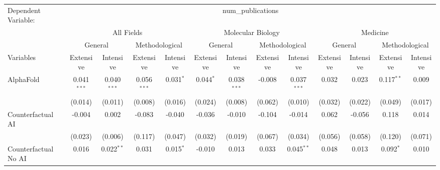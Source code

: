 \begingroup
\centering
\begin{tabular}{lcccccccccccc}
   \tabularnewline \midrule \midrule
   Dependent Variable: & \multicolumn{12}{c}{num\_publications}\\
 & \multicolumn{4}{c}{All Fields} & \multicolumn{4}{c}{Molecular Biology} & \multicolumn{4}{c}{Medicine} \\
\cmidrule(lr){2-5} \cmidrule(lr){6-9} \cmidrule(lr){10-13}
 & \multicolumn{2}{c}{General} & \multicolumn{2}{c}{Methodological} & \multicolumn{2}{c}{General} & \multicolumn{2}{c}{Methodological} & \multicolumn{2}{c}{General} & \multicolumn{2}{c}{Methodological} \\
\cmidrule(lr){2-3} \cmidrule(lr){4-5} \cmidrule(lr){6-7} \cmidrule(lr){8-9} \cmidrule(lr){10-11} \cmidrule(lr){12-13}
Variables & \multicolumn{1}{c}{Extensive} & \multicolumn{1}{c}{Intensive} & \multicolumn{1}{c}{Extensive} & \multicolumn{1}{c}{Intensive} & \multicolumn{1}{c}{Extensive} & \multicolumn{1}{c}{Intensive} & \multicolumn{1}{c}{Extensive} & \multicolumn{1}{c}{Intensive} & \multicolumn{1}{c}{Extensive} & \multicolumn{1}{c}{Intensive} & \multicolumn{1}{c}{Extensive} & \multicolumn{1}{c}{Intensive} \\
\cmidrule(lr){1-1}\cmidrule(lr){2-2} \cmidrule(lr){3-3} \cmidrule(lr){4-4} \cmidrule(lr){5-5} \cmidrule(lr){6-6} \cmidrule(lr){7-7} \cmidrule(lr){8-8} \cmidrule(lr){9-9} \cmidrule(lr){10-10} \cmidrule(lr){11-11} \cmidrule(lr){12-12} \cmidrule(lr){13-13}
   AlphaFold                                & 0.041$^{***}$ & 0.040$^{***}$ & 0.056$^{***}$ & 0.031$^{*}$ & 0.044$^{*}$  & 0.038$^{***}$ & -0.008       & 0.037$^{***}$ & 0.032   & 0.023   & 0.117$^{**}$ & 0.009\\   
                                            & (0.014)       & (0.011)       & (0.008)       & (0.016)     & (0.024)      & (0.008)       & (0.062)      & (0.010)       & (0.032) & (0.022) & (0.049)      & (0.017)\\   
   Counterfactual AI                        & -0.004        & 0.002         & -0.083        & -0.040      & -0.036       & -0.010        & -0.104       & -0.014        & 0.062   & -0.056  & 0.118        & 0.014\\   
                                            & (0.023)       & (0.006)       & (0.117)       & (0.047)     & (0.032)      & (0.019)       & (0.067)      & (0.034)       & (0.056) & (0.058) & (0.120)      & (0.071)\\   
   Counterfactual No AI                     & 0.016         & 0.022$^{**}$  & 0.031         & 0.015$^{*}$ & -0.010       & 0.013         & 0.033        & 0.045$^{**}$  & 0.048   & 0.013   & 0.092$^{*}$  & 0.010\\   

\end{tabular}
